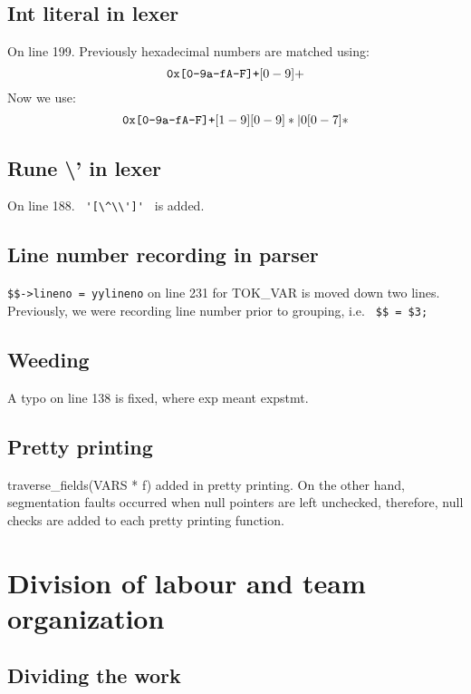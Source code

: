 \documentclass{article}
\begin{document}
\subsection{Int literal in lexer}
On line 199. Previously hexadecimal numbers are matched using:
\[
        \verb|0x[0-9a-fA-F]+|[0-9]+
\]
Now we use:
\[
        \verb|0x[0-9a-fA-F]+|[1-9][0-9]*|0[0-7]*
\]

\subsection{Rune \textbackslash{}' in lexer}
On line 188. \verb| '[\^\\']' | is added.

\subsection{Line number recording in parser}
\verb|$$->lineno = yylineno| on line 231 for TOK\_VAR is moved down two lines. Previously, we were recording line number prior to grouping, i.e. \verb| $$ = $3; |

\subsection{Weeding}
A typo on line 138 is fixed, where exp meant expstmt.

\subsection{Pretty printing}
traverse\_fields(VARS * f) added in pretty printing. On the other hand, segmentation faults occurred when null pointers are left unchecked, therefore, null checks are added to each pretty printing function.

\section{Division of labour and team organization}

\subsection{Dividing the work}

\end{document}
